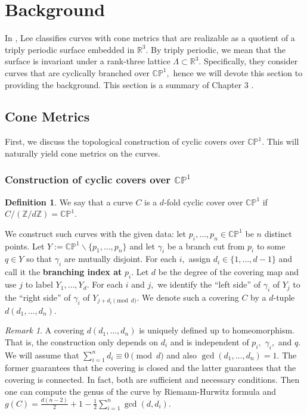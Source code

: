 \documentclass[12pt,reqno]{amsart}
\newcommand{\Z}{\mathbb{Z}}
\newcommand{\R}{\mathbb{R}}
\theoremstyle{definition}
\newtheorem{defn}{Definition}
\theoremstyle{remark}
\newtheorem*{remark}{Remark}
\begin{document}
\section{Background}
\label{sec: dthesis}
In \cite{dthesis}, Lee classifies curves with cone metrics that are realizable as a quotient of a triply periodic surface embedded in $\R^3.$ By triply periodic, we mean that the surface is invariant under a rank-three lattice $\Lambda \subset \R^3.$ Specifically, they consider curves that are cyclically branched over $\mathbb{C}\mathbb{P}^1,$ hence we will devote this section to providing the background. This section is a summary of Chapter 3 \cite{dthesis}. 

\subsection{Cone Metrics}
First, we discuss the topological construction of cyclic covers over $\mathbb{C}\mathbb{P}^1.$ This will naturally yield cone metrics on the curves.

\subsubsection*{Construction of cyclic covers over $\mathbb{C}\mathbb{P}^1$}
\begin{defn} We say that a curve $C$ is a $d$-fold cyclic cover over $\mathbb{C}\mathbb{P}^1$ if $C / (\Z/ d \Z) = \mathbb{C}\mathbb{P}^1.$ \end{defn}

We construct such curves with the given data: let $p_i, \ldots , p_n \in \mathbb{C}\mathbb{P}^1$ be $n$ distinct points. Let $Y := \mathbb{C}\mathbb{P}^1 \backslash \{p_1, \ldots, p_n\}$ and let $\gamma_i$ be a branch cut from $p_i$ to some $q \in Y$ so that $\gamma_i$ are mutually disjoint. For each $i,$ assign $d_i \in \{1, \ldots, d - 1\}$ and call it the \textbf{branching index at} $p_i.$ Let $d$ be the degree of the covering map and use $j$ to label $Y_1, \ldots , Y_d.$ For each $i$ and $j,$ we identify the ``left side'' of $\gamma_i$ of $Y_j$ to the ``right side'' of $\gamma_i$ of $Y_{j + d_i \pmod d}.$ We denote such a covering $C$ by a $d$-tuple $d (d_1, \ldots , d_n).$


\begin{remark} A covering $d (d_1, \ldots , d_n)$ is uniquely defined up to homeomorphism. That is, the construction only depends on $d_i$ and is independent of $p_i,$ $\gamma_i,$ and $q.$ We will assume that $\sum\limits_{i=1}^n d_i \equiv 0 \pmod d$ and also $\gcd (d_1, \ldots, d_n) = 1.$ The former guarantees that the covering is closed and the latter guarantees that the covering is connected. In fact, both are sufficient and necessary conditions. Then one can compute the genus of the curve by Riemann-Hurwitz formula and $g(C) = \frac{d (n-2)}{2} + 1 - \frac{1}{2} \sum\limits_{i=1}^n \gcd(d,d_i).$ 
\end{remark}
\end{document}
